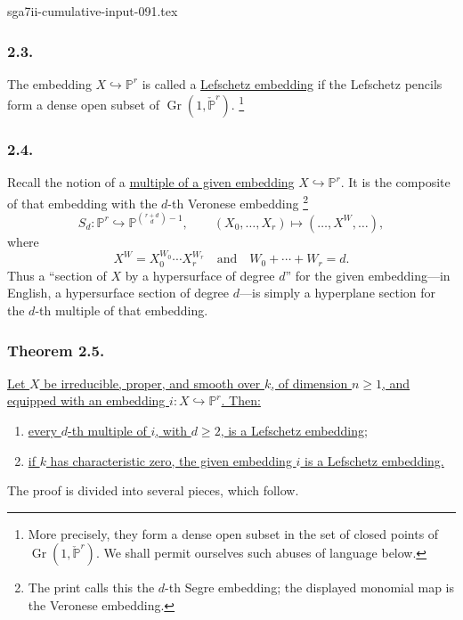 \begin{filecontents*}{sga7ii-cumulative-input-091.tex}
\subsubsection*{2.3.}
The embedding $X\hookrightarrow\mathbb P^r$ is called a
\underline{Lefschetz embedding} if the Lefschetz pencils form a dense
open subset of $\operatorname{Gr}(1,\check{\mathbb P}^{r})$.
\footnote{More precisely, they form a dense open subset in the set of
closed points of $\operatorname{Gr}(1,\check{\mathbb P}^{r})$.  We
shall permit ourselves such abuses of language below.}

\subsubsection*{2.4.}
Recall the notion of a \underline{multiple of a given embedding}
$X\hookrightarrow\mathbb P^r$.  It is the composite of that embedding
with the $d$-th Veronese embedding
\footnote{The print calls this the $d$-th Segre embedding; the
displayed monomial map is the Veronese embedding.}
\[
S_d:\mathbb P^r\hookrightarrow
\mathbb P^{\binom{r+d}{d}-1},
\qquad
(X_0,\ldots,X_r)\longmapsto(\ldots,X^W,\ldots),
\]
where
\[
X^W=X_0^{W_0}\cdots X_r^{W_r}
\quad\text{and}\quad
W_0+\cdots+W_r=d.
\]
Thus a ``section of $X$ by a hypersurface of degree $d$'' for the
given embedding---in English, a hypersurface section of degree
$d$---is simply a hyperplane section for the $d$-th multiple of that
embedding.

\subsubsection*{Theorem 2.5.}
\underline{Let $X$ be irreducible, proper, and smooth over $k$, of
dimension $n\geq1$, and equipped with an embedding
$i:X\hookrightarrow\mathbb P^r$.  Then:}
\begin{enumerate}
\item[2.5.1.] \underline{every $d$-th multiple of $i$, with $d\geq2$,
is a Lefschetz embedding;}
\item[2.5.2.] \underline{if $k$ has characteristic zero, the given
embedding $i$ is a Lefschetz embedding.}
\end{enumerate}
The proof is divided into several pieces, which follow.
\end{filecontents*}
